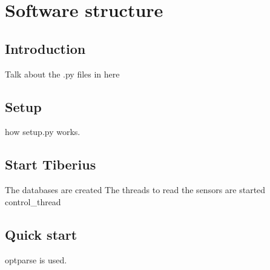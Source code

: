 \section{Software structure}
\pagestyle{aidan}

\subsection{Introduction}
Talk about the .py files in here

\subsection{Setup}
how setup.py works.

\subsection{Start Tiberius}
The databases are created
The threads to read the sensors are started
control_thread

\subsection{Quick start}
optparse is used.

